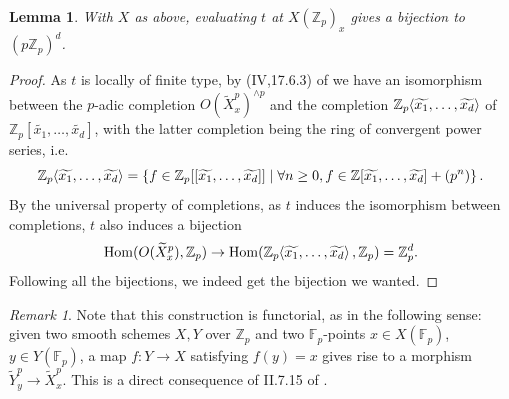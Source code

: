 \documentclass[12pt]{article}
\newcommand{\Z}{\mathbb{Z}}
\newcommand{\F}{\mathbb{F}}
\renewcommand{\angle}[1]{\hspace{-2pt}\left\langle #1 \right\rangle}
\DeclareMathOperator{\Hom}{Hom}
\theoremstyle{plain}
\newtheorem{lem}[thm]{Lemma} %
\theoremstyle{definition}
\theoremstyle{remark}
\newtheorem{rem}[thm]{Remark} %
\begin{document}
\begin{lem}
With $X$ as above, evaluating $t$ at $X(\Z_p)_x$ gives a bijection to $(p\Z_p)^d$.
\end{lem}
\begin{proof}
As $t$ is locally of finite type, by (IV,17.6.3) of \cite{ega} we have an isomorphism between the $p$-adic completion $O(\widetilde{X}_x^p)^{\wedge p}$ and the completion $\Z_p\angle{\widetilde{x_1},\dots, \widetilde{x_d}}$ of $\Z_p[\widetilde{x_1},\dots,\widetilde{x_d}]$, with the latter completion being the ring of convergent power series, i.e.
\[
\Z_p\angle{\widetilde{x_1},\dots, \widetilde{x_d}} = \left\{f \in \Z_p[[\widetilde{x_1},\dots,\widetilde{x_d}]] \mid \forall n \geq 0, f \in \Z[\widetilde{x_1},\dots,\widetilde{x_d}] + (p^n) \right\}.
\]
By the universal property of completions, as $t$ induces the isomorphism between completions, $t$ also induces a bijection $$\Hom(O(\widetilde{X}_x^p), \Z_p) \to \Hom(\Z_p\angle{\widetilde{x_1},\dots,\widetilde{x_d}},\Z_p) = \Z_p^d.$$ Following all the bijections, we indeed get the bijection we wanted.
\end{proof}

\begin{rem}
\label{rem:smoothpointsfunc}
Note that this construction is functorial, as in the following sense: given two smooth schemes $X,Y$ over $\Z_p$ and two $\F_p$-points $x\in X(\F_p)$, $y\in Y(\F_p)$, a map $f: Y \to X$ satisfying $f(y) = x$ gives rise to a morphism $\widetilde{Y}_y^p \to \widetilde{X}_x^p$. This is a direct consequence of II.7.15 of \citep{hartshorne}.
\end{rem}
\end{document}
